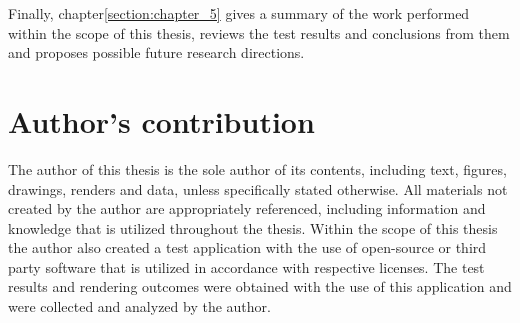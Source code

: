 Finally, chapter\ref{section:chapter_5} gives a summary of the work performed within the scope of this thesis, reviews the test results and conclusions from them and proposes possible future research directions.

\section{Author's contribution}
The author of this thesis is the sole author of its contents, including text, figures, drawings, renders and data, unless specifically stated otherwise. All materials not created by the author are appropriately referenced, including information and knowledge that is utilized throughout the thesis. Within the scope of this thesis the author also created a test application with the use of open-source or third party software that is utilized in accordance with respective licenses. The test results and rendering outcomes were obtained with the use of this application and were collected and analyzed by the author.


